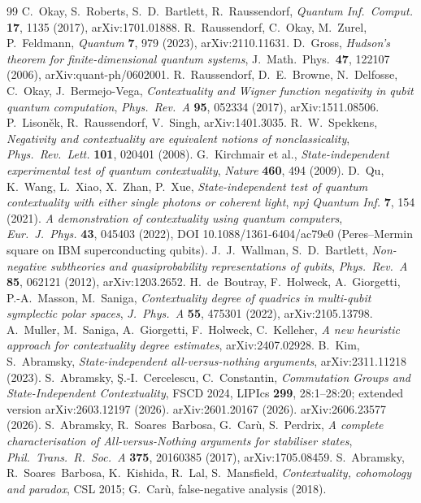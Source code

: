 \documentclass[11pt]{article}
\theoremstyle{remark}
\begin{document}
\begin{thebibliography}{99}
 C.~Okay, S.~Roberts, S.~D.~Bartlett, R.~Raussendorf,
\emph{Quantum Inf.\ Comput.} \textbf{17}, 1135 (2017), arXiv:1701.01888.
 R.~Raussendorf, C.~Okay, M.~Zurel, P.~Feldmann,
\emph{Quantum} \textbf{7}, 979 (2023), arXiv:2110.11631.
 D.~Gross, \emph{Hudson's theorem for finite-dimensional quantum systems},
J.~Math.\ Phys.\ \textbf{47}, 122107 (2006), arXiv:quant-ph/0602001.
 R.~Raussendorf, D.~E.~Browne, N.~Delfosse, C.~Okay, J.~Bermejo-Vega,
\emph{Contextuality and Wigner function negativity in qubit quantum computation},
\emph{Phys.\ Rev.\ A} \textbf{95}, 052334 (2017), arXiv:1511.08506.
 P.~Lison\v{e}k, R.~Raussendorf, V.~Singh, arXiv:1401.3035.
 R.~W.~Spekkens, \emph{Negativity and contextuality are equivalent notions of
nonclassicality}, \emph{Phys.\ Rev.\ Lett.} \textbf{101}, 020401 (2008).
 G.~Kirchmair et al., \emph{State-independent experimental test of quantum
contextuality}, \emph{Nature} \textbf{460}, 494 (2009).
 D.~Qu, K.~Wang, L.~Xiao, X.~Zhan, P.~Xue, \emph{State-independent test of quantum
contextuality with either single photons or coherent light}, \emph{npj Quantum Inf.} \textbf{7}, 154
(2021).
 \emph{A demonstration of contextuality using quantum computers}, \emph{Eur.\ J.\ Phys.}
\textbf{43}, 045403 (2022), DOI 10.1088/1361-6404/ac79e0 (Peres--Mermin square on IBM superconducting
qubits).
 J.~J.~Wallman, S.~D.~Bartlett, \emph{Non-negative subtheories and quasiprobability
representations of qubits}, \emph{Phys.\ Rev.\ A} \textbf{85}, 062121 (2012), arXiv:1203.2652.
 H.~de~Boutray, F.~Holweck, A.~Giorgetti, P.-A.~Masson, M.~Saniga,
\emph{Contextuality degree of quadrics in multi-qubit symplectic polar spaces}, \emph{J.\ Phys.\ A}
\textbf{55}, 475301 (2022), arXiv:2105.13798.
 A.~Muller, M.~Saniga, A.~Giorgetti, F.~Holweck, C.~Kelleher, \emph{A new heuristic
approach for contextuality degree estimates}, arXiv:2407.02928.
 B.~Kim, S.~Abramsky, \emph{State-independent all-versus-nothing arguments},
arXiv:2311.11218 (2023).
 S.~Abramsky, \c{S}.-I.~Cercelescu, C.~Constantin, \emph{Commutation Groups and State-Independent Contextuality}, FSCD 2024, LIPIcs \textbf{299}, 28:1--28:20; extended version arXiv:2603.12197 (2026).
 arXiv:2601.20167 (2026).
 arXiv:2606.23577 (2026).
 S.~Abramsky, R.~Soares~Barbosa, G.~Car\`u, S.~Perdrix, \emph{A complete characterisation
of All-versus-Nothing arguments for stabiliser states}, \emph{Phil.\ Trans.\ R.\ Soc.\ A} \textbf{375},
20160385 (2017), arXiv:1705.08459.
 S.~Abramsky, R.~Soares~Barbosa, K.~Kishida, R.~Lal, S.~Mansfield, \emph{Contextuality,
cohomology and paradox}, CSL 2015; G.~Car\`u, false-negative analysis (2018).
\end{thebibliography}
\end{document}
